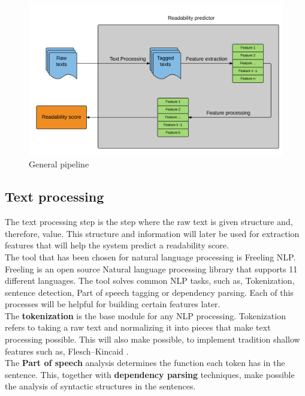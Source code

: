 \documentclass[12pt]{article}
\begin{document}
\begin{figure}[h]
\includegraphics[width=\textwidth]{pipeline}
\caption{General pipeline}
\label{fig:pipeline}
\end{figure}

\subsection{Text processing}

The text processing step is the step where the raw text is given structure and, therefore, value. This structure and information will later be used for extraction features that will help the system predict a readability score.\\

The tool that has been chosen for natural language processing is Freeling NLP\cite{freelingNLP}. Freeling is an open source Natural language processing library that supports 11 different languages. The tool solves common NLP tasks, such as, Tokenization, sentence detection, Part of speech tagging or dependency parsing. Each of this processes will be helpful for building certain features later.\\

The \textbf{tokenization} is the base module for any NLP processing. Tokenization refers to taking a raw text and normalizing it into pieces that make text processing possible. This will also make possible, to implement tradition shallow features such as, Flesch–Kincaid \cite{flesch}. \\

The \textbf{Part of speech} analysis determines the function each token has in the sentence. This, together with \textbf{dependency parsing} techniques, make possible the analysis of syntactic structures in the sentences.\\
\end{document}
